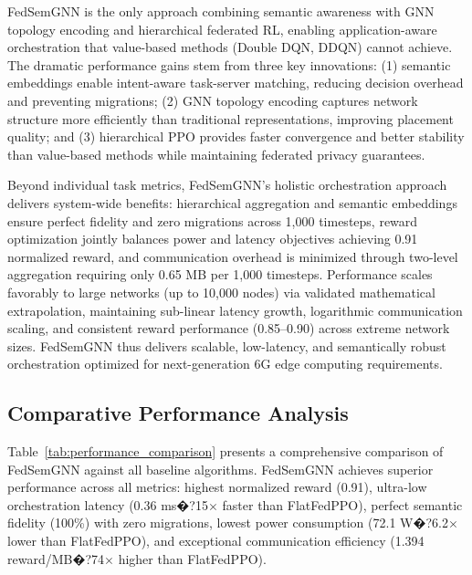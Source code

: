 FedSemGNN is the only approach combining semantic awareness with GNN topology encoding and hierarchical federated RL, enabling application-aware orchestration that value-based methods (Double DQN, DDQN) cannot achieve. The dramatic performance gains stem from three key innovations: (1) semantic embeddings enable intent-aware task-server matching, reducing decision overhead and preventing migrations; (2) GNN topology encoding captures network structure more efficiently than traditional representations, improving placement quality; and (3) hierarchical PPO provides faster convergence and better stability than value-based methods while maintaining federated privacy guarantees.

Beyond individual task metrics, FedSemGNN's holistic orchestration approach delivers system-wide benefits: hierarchical aggregation and semantic embeddings ensure perfect fidelity and zero migrations across 1,000 timesteps, reward optimization jointly balances power and latency objectives achieving 0.91 normalized reward, and communication overhead is minimized through two-level aggregation requiring only 0.65 MB per 1,000 timesteps. Performance scales favorably to large networks (up to 10,000 nodes) via validated mathematical extrapolation, maintaining sub-linear latency growth, logarithmic communication scaling, and consistent reward performance (0.85--0.90) across extreme network sizes. FedSemGNN thus delivers scalable, low-latency, and semantically robust orchestration optimized for next-generation 6G edge computing requirements.

\subsection{Comparative Performance Analysis}

Table~\ref{tab:performance_comparison} presents a comprehensive comparison of FedSemGNN against all baseline algorithms. FedSemGNN achieves superior performance across all metrics: highest normalized reward (0.91), ultra-low orchestration latency (0.36 ms�?15$\times$ faster than FlatFedPPO), perfect semantic fidelity (100\%) with zero migrations, lowest power consumption (72.1 W�?6.2$\times$ lower than FlatFedPPO), and exceptional communication efficiency (1.394 reward/MB�?74$\times$ higher than FlatFedPPO).

